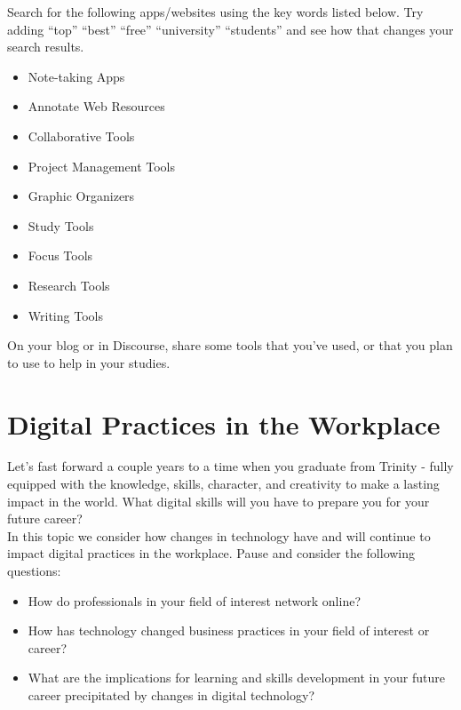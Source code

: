 \documentclass[
]{book}
\providecommand{\tightlist}{%
  \setlength{\itemsep}{0pt}\setlength{\parskip}{0pt}}
\theoremstyle{definition}
\theoremstyle{definition}
\theoremstyle{definition}
\theoremstyle{definition}
\theoremstyle{remark}
\begin{document}
\begin{reflect}
Search for the following apps/websites using the key words listed below. Try adding ``top'' ``best'' ``free'' ``university'' ``students'' and see how that changes your search results.

\begin{itemize}
\tightlist
\item
  Note-taking Apps
\item
  Annotate Web Resources
\item
  Collaborative Tools
\item
  Project Management Tools
\item
  Graphic Organizers
\item
  Study Tools
\item
  Focus Tools
\item
  Research Tools
\item
  Writing Tools
\end{itemize}

On your blog or in Discourse, share some tools that you've used, or that you plan to use to help in your studies.
\end{reflect}

\hypertarget{digital-practices-in-the-workplace}{%
\section{Digital Practices in the Workplace}\label{digital-practices-in-the-workplace}}

Let's fast forward a couple years to a time when you graduate from Trinity - fully equipped with the knowledge, skills, character, and creativity to make a lasting impact in the world. What digital skills will you have to prepare you for your future career?\\
In this topic we consider how changes in technology have and will continue to impact digital practices in the workplace. Pause and consider the following questions:

\begin{itemize}
\tightlist
\item
  How do professionals in your field of interest network online?\\
\item
  How has technology changed business practices in your field of interest or career?\\
\item
  What are the implications for learning and skills development in your future career precipitated by changes in digital technology?
\end{itemize}
\end{document}
